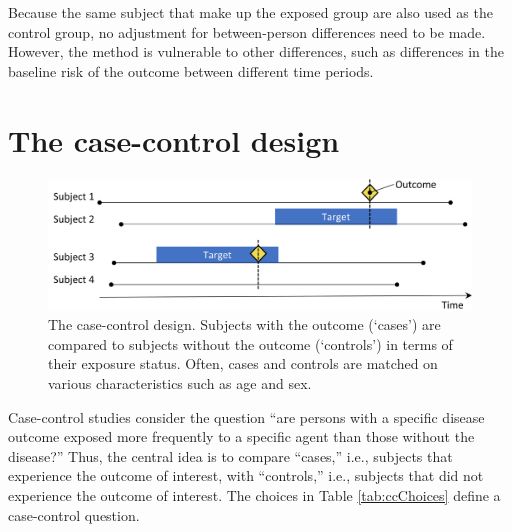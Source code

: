\documentclass[]{book}
\begin{document}
Because the same subject that make up the exposed group are also used as the control group, no adjustment for between-person differences need to be made. However, the method is vulnerable to other differences, such as differences in the baseline risk of the outcome between different time periods.

\hypertarget{the-case-control-design}{%
\section{The case-control design}\label{the-case-control-design}}


\begin{figure}

{\centering \includegraphics[width=0.9\linewidth]{images/PopulationLevelEstimation/caseControl} 

}

\caption{The case-control design. Subjects with the outcome (‘cases’) are compared to subjects without the outcome (‘controls’) in terms of their exposure status. Often, cases and controls are matched on various characteristics such as age and sex.}\label{fig:caseControl}
\end{figure}

Case-control studies \citep{vandenbroucke_2012} consider the question ``are persons with a specific disease outcome exposed more frequently to a specific agent than those without the disease?'' Thus, the central idea is to compare ``cases,'' i.e., subjects that experience the outcome of interest, with ``controls,'' i.e., subjects that did not experience the outcome of interest. The choices in Table \ref{tab:ccChoices} define a case-control question.   
\end{document}
